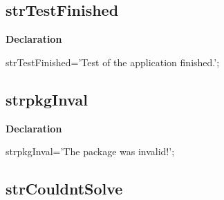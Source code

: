 \documentclass{report}
\newif\ifpdf
\begin{document}
\subsection*{strTestFinished}
\fi
\label{trstrings-strTestFinished}
\begin{list}{}{
\setlength{\itemindent}{0cm}
\setlength{\listparindent}{0cm}
\setlength{\leftmargin}{\evensidemargin}
\addtolength{\leftmargin}{\tmplength}
\settowidth{\labelsep}{X}
\addtolength{\leftmargin}{\labelsep}
\setlength{\labelwidth}{\tmplength}
}
\item[\textbf{Declaration}\hfill]
\ifpdf
\begin{flushleft}
\fi
\begin{ttfamily}
strTestFinished='Test of the application finished.';\end{ttfamily}

\ifpdf
\end{flushleft}
\fi

\end{list}
\ifpdf
\subsection*{\large{\textbf{strpkgInval}}\normalsize\hspace{1ex}\hrulefill}
\else
\subsection*{strpkgInval}
\fi
\label{trstrings-strpkgInval}
\begin{list}{}{
\setlength{\itemindent}{0cm}
\setlength{\listparindent}{0cm}
\setlength{\leftmargin}{\evensidemargin}
\addtolength{\leftmargin}{\tmplength}
\settowidth{\labelsep}{X}
\addtolength{\leftmargin}{\labelsep}
\setlength{\labelwidth}{\tmplength}
}
\item[\textbf{Declaration}\hfill]
\ifpdf
\begin{flushleft}
\fi
\begin{ttfamily}
strpkgInval='The package was invalid!';\end{ttfamily}

\ifpdf
\end{flushleft}
\fi

\end{list}
\ifpdf
\subsection*{\large{\textbf{strCouldntSolve}}\normalsize\hspace{1ex}\hrulefill}
\else
\end{document}
